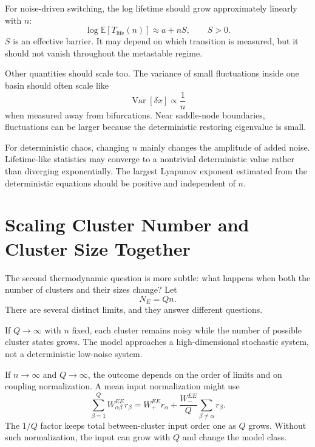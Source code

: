 For noise-driven switching, the log lifetime should grow approximately linearly with $n$:
%
\begin{equation}
  \log \mathbb{E}[T_{\mathrm{life}}(n)]
  \approx
  a + nS ,
  \qquad
  S>0 .
  \label{eq:log-lifetime-linear-n}
\end{equation}
%
$S$ is an effective barrier. It may depend on which transition is measured, but it should not vanish throughout the metastable regime.

Other quantities should scale too. The variance of small fluctuations inside one basin should often scale like
%
\begin{equation}
  \operatorname{Var}[\delta x]
  \propto
  \frac{1}{n}
  \label{eq:within-basin-variance-scaling}
\end{equation}
%
when measured away from bifurcations. Near saddle-node boundaries, fluctuations can be larger because the deterministic restoring eigenvalue is small.

For deterministic chaos, changing $n$ mainly changes the amplitude of added noise. Lifetime-like statistics may converge to a nontrivial deterministic value rather than diverging exponentially. The largest Lyapunov exponent estimated from the deterministic equations should be positive and independent of $n$.

\section{Scaling Cluster Number and Cluster Size Together}
\label{sec:scaling-cluster-number-and-size-together}

The second thermodynamic question is more subtle: what happens when both the number of clusters and their sizes change? Let
%
\begin{equation}
  N_E = Qn .
  \label{eq:total-e-size-qn}
\end{equation}
%
There are several distinct limits, and they answer different questions.

If $Q\to\infty$ with $n$ fixed, each cluster remains noisy while the number of possible cluster states grows. The model approaches a high-dimensional stochastic system, not a deterministic low-noise system.

If $n\to\infty$ and $Q\to\infty$, the outcome depends on the order of limits and on coupling normalization. A mean input normalization might use
%
\begin{equation}
  \sum_{\beta=1}^{Q} W_{\alpha\beta}^{EE} r_{\beta}
  =
  W_{+}^{EE}r_{\alpha}
  +
  \frac{W_{-}^{EE}}{Q}
  \sum_{\beta\ne\alpha} r_{\beta}.
  \label{eq:q-normalized-coupling}
\end{equation}
%
The $1/Q$ factor keeps total between-cluster input order one as $Q$ grows. Without such normalization, the input can grow with $Q$ and change the model class.

